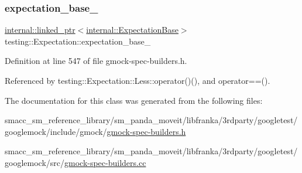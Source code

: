 \subsubsection{\texorpdfstring{expectation\+\_\+base\+\_\+}{expectation\_base\_}}
{\footnotesize\ttfamily \hyperlink{classtesting_1_1internal_1_1linked__ptr}{internal\+::linked\+\_\+ptr}$<$\hyperlink{classtesting_1_1internal_1_1ExpectationBase}{internal\+::\+Expectation\+Base}$>$ testing\+::\+Expectation\+::expectation\+\_\+base\+\_\+\hspace{0.3cm}{\ttfamily [private]}}



Definition at line 547 of file gmock-\/spec-\/builders.\+h.



Referenced by testing\+::\+Expectation\+::\+Less\+::operator()(), and operator==().



The documentation for this class was generated from the following files\+:\begin{DoxyCompactItemize}
\item 
smacc\+\_\+sm\+\_\+reference\+\_\+library/sm\+\_\+panda\+\_\+moveit/libfranka/3rdparty/googletest/googlemock/include/gmock/\hyperlink{gmock-spec-builders_8h}{gmock-\/spec-\/builders.\+h}\item 
smacc\+\_\+sm\+\_\+reference\+\_\+library/sm\+\_\+panda\+\_\+moveit/libfranka/3rdparty/googletest/googlemock/src/\hyperlink{gmock-spec-builders_8cc}{gmock-\/spec-\/builders.\+cc}\end{DoxyCompactItemize}
